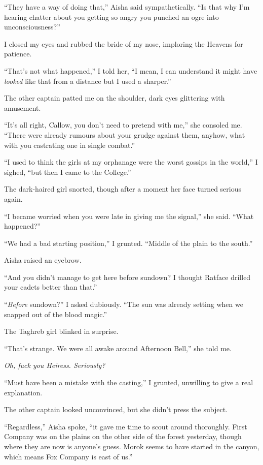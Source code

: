 \documentclass[12pt, openany]{book}
\begin{document}
“They have a way of doing that,” Aisha said sympathetically. “Is that why I’m hearing chatter about you getting so angry you punched an ogre into unconsciousness?”

I closed my eyes and rubbed the bride of my nose, imploring the Heavens for patience. 

“That’s not what happened,” I told her, “I mean, I can understand it might have \textit{looked} like that from a distance but I used a sharper.”

The other captain patted me on the shoulder, dark eyes glittering with amusement.

“It’s all right, Callow, you don’t need to pretend with me,” she consoled me. “There were already rumours about your grudge against them, anyhow, what with you castrating one in single combat.”

“I used to think the girls at my orphanage were the worst gossips in the world,” I sighed, “but then I came to the College.”

The dark-haired girl snorted, though after a moment her face turned serious again.

“I became worried when you were late in giving me the signal,” she said. “What happened?”

“We had a bad starting position,” I grunted. “Middle of the plain to the south.”

Aisha raised an eyebrow.

“And you didn’t manage to get here before sundown? I thought Ratface drilled your cadets better than that.”

“\textit{Before} sundown?” I asked dubiously. “The sun was already setting when we snapped out of the blood magic.”

The Taghreb girl blinked in surprise.

“That’s strange. We were all awake around Afternoon Bell,” she told me.

\textit{Oh, fuck you Heiress. Seriously?}

“Must have been a mistake with the casting,” I grunted, unwilling to give a real explanation.

The other captain looked unconvinced, but she didn’t press the subject.

“Regardless,” Aisha spoke, “it gave me time to scout around thoroughly. First Company was on the plains on the other side of the forest yesterday, though where they are now is anyone’s guess. Morok seems to have started in the canyon, which means Fox Company is east of us.”
\end{document}
